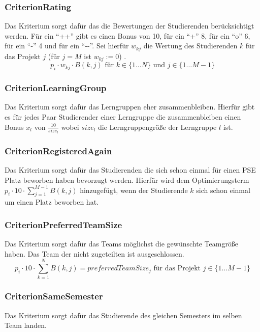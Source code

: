 \documentclass[parskip=full]{scrartcl}
\begin{document}
\subsubsection{CriterionRating}
Das Kriterium sorgt dafür das die Bewertungen der Studierenden berücksichtigt
werden. Für ein \enquote{++} gibt es einen Bonus von 10, für ein \enquote{+} 8,
für ein \enquote{o} 6, für ein \enquote{-} 4 und für ein \enquote{-{}-}. Sei
hierfür $w_{kj}$ die Wertung des Studierenden $k$ für das Projekt $j$ (für $j =
M$ ist $w_{kj} := 0$) .
\begin{equation*}
p_i \cdot w_{kj} \cdot B(k,j) \text{ für } k \in \{ 1\ldots N \} \text{ und }j
\in \{ 1\ldots M -1 \}
\end{equation*}

\subsubsection{CriterionLearningGroup}
Das Kriterium sorgt dafür das Lerngruppen eher zusammenbleiben. Hierfür gibt es
für jedes Paar Studierender einer Lerngruppe die zusammenbleiben einen Bonus
$x_l$ von $\frac{10}{size_l}$ wobei $size_l$ die Lerngruppengröße der Lerngruppe
$l$ ist.
\begin{equation*}
\end{equation*} %

\subsubsection{CriterionRegisteredAgain}
Das Kriterium sorgt dafür das Studierenden die sich schon einmal für einen PSE
Platz beworben haben bevorzugt werden. Hierfür wird dem Optimierungsterm
$p_i \cdot 10 \cdot \sum_{j = 1}^{M-1} B(k,j)$ hinzugefügt, wenn der
Studierende $k$ sich schon einmal um einen Platz beworben hat.
\subsubsection{CriterionPreferredTeamSize}
Das Kriterium sorgt dafür das Teams möglichst die gewünschte Teamgröße haben.
Das Team der nicht zugeteilten ist ausgeschlossen.
\begin{equation*}
p_i \cdot 10 \cdot \sum_{k = 1}^{N} B(k,j) = preferredTeamSize_j
\text{ für das Projekt }  j \in \{ 1\ldots M-1 \} %
\end{equation*}
\subsubsection{CriterionSameSemester}
Das Kriterium sorgt dafür das Studierende des gleichen Semesters im selben Team
landen.
\end{document}
